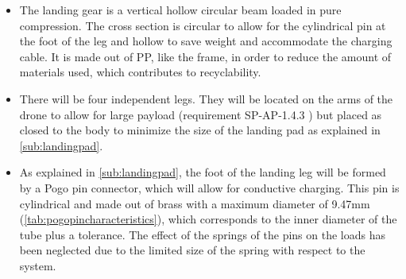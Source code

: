 \begin{itemize}[noitemsep, nolistsep]
    \item The landing gear is a vertical hollow circular beam loaded in pure compression. The cross section is circular to allow for the cylindrical pin at the foot of the leg and hollow to save weight and accommodate the charging cable. It is made out of PP, like the frame, in order to reduce the amount of materials used, which contributes to recyclability.
    
    
    
    \item There will be four independent legs. They will be located on the arms of the drone to allow for large payload (requirement SP-AP-1.4.3 \label{req:SP-AP-1.4.3}) but placed as closed to the body to minimize the size of the landing pad as explained in \autoref{sub:landingpad}. 
    
    
    
    \item As explained in \autoref{sub:landingpad}, the foot of the landing leg will be formed by a Pogo pin connector, which will allow for conductive charging. This pin is cylindrical and made out of brass with a maximum diameter of 9.47mm (\autoref{tab:pogopincharacteristics}), which corresponds to the inner diameter of the tube plus a tolerance. The effect of the springs of the pins on the loads has been neglected due to the limited size of the spring with respect to the system.
    

\end{itemize}
